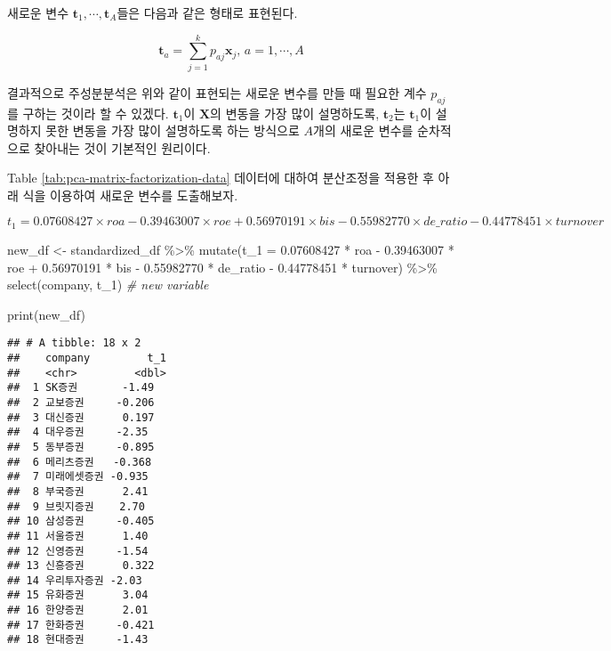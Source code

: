 \documentclass[
]{book}
\newenvironment{Shaded}{\begin{snugshade}}{\end{snugshade}}
\newcommand{\AttributeTok}[1]{\textcolor[rgb]{0.77,0.63,0.00}{#1}}
\newcommand{\CommentTok}[1]{\textcolor[rgb]{0.56,0.35,0.01}{\textit{#1}}}
\newcommand{\FloatTok}[1]{\textcolor[rgb]{0.00,0.00,0.81}{#1}}
\newcommand{\FunctionTok}[1]{\textcolor[rgb]{0.00,0.00,0.00}{#1}}
\newcommand{\NormalTok}[1]{#1}
\newcommand{\OtherTok}[1]{\textcolor[rgb]{0.56,0.35,0.01}{#1}}
\newcommand{\SpecialCharTok}[1]{\textcolor[rgb]{0.00,0.00,0.00}{#1}}
\begin{document}
새로운 변수 \(\mathbf{t}_1, \cdots, \mathbf{t}_A\)들은 다음과 같은 형태로 표현된다.

\begin{equation}
\mathbf{t}_a = \sum_{j = 1}^{k} p_{aj} \mathbf{x}_j, \, a = 1, \cdots, A
\end{equation}

결과적으로 주성분분석은 위와 같이 표현되는 새로운 변수를 만들 때 필요한 계수 \(p_{aj}\)를 구하는 것이라 할 수 있겠다. \(\mathbf{t}_1\)이 \(\mathbf{X}\)의 변동을 가장 많이 설명하도록, \(\mathbf{t}_2\)는 \(\mathbf{t}_1\)이 설명하지 못한 변동을 가장 많이 설명하도록 하는 방식으로 \(A\)개의 새로운 변수를 순차적으로 찾아내는 것이 기본적인 원리이다.

Table \ref{tab:pca-matrix-factorization-data} 데이터에 대하여 분산조정을 적용한 후 아래 식을 이용하여 새로운 변수를 도출해보자.

\[
t_1 = 0.07608427 \times roa - 0.39463007 \times roe + 0.56970191 \times bis - 0.55982770 \times de\_ratio - 0.44778451 \times turnover
\]

\begin{Shaded}
\begin{Highlighting}[]
\NormalTok{new\_df }\OtherTok{\textless{}{-}}\NormalTok{ standardized\_df }\SpecialCharTok{\%\textgreater{}\%} 
  \FunctionTok{mutate}\NormalTok{(}\AttributeTok{t\_1 =} \FloatTok{0.07608427} \SpecialCharTok{*}\NormalTok{ roa }\SpecialCharTok{{-}} \FloatTok{0.39463007} \SpecialCharTok{*}\NormalTok{ roe }
         \SpecialCharTok{+} \FloatTok{0.56970191} \SpecialCharTok{*}\NormalTok{ bis }\SpecialCharTok{{-}} \FloatTok{0.55982770} \SpecialCharTok{*}\NormalTok{ de\_ratio }
         \SpecialCharTok{{-}} \FloatTok{0.44778451} \SpecialCharTok{*}\NormalTok{ turnover) }\SpecialCharTok{\%\textgreater{}\%}
  \FunctionTok{select}\NormalTok{(company, t\_1) }\CommentTok{\# new variable}
\end{Highlighting}
\end{Shaded}

\begin{Shaded}
\begin{Highlighting}[]
\FunctionTok{print}\NormalTok{(new\_df)}
\end{Highlighting}
\end{Shaded}

\begin{verbatim}
## # A tibble: 18 x 2
##    company         t_1
##    <chr>         <dbl>
##  1 SK증권       -1.49 
##  2 교보증권     -0.206
##  3 대신증권      0.197
##  4 대우증권     -2.35 
##  5 동부증권     -0.895
##  6 메리츠증권   -0.368
##  7 미래에셋증권 -0.935
##  8 부국증권      2.41 
##  9 브릿지증권    2.70 
## 10 삼성증권     -0.405
## 11 서울증권      1.40 
## 12 신영증권     -1.54 
## 13 신흥증권      0.322
## 14 우리투자증권 -2.03 
## 15 유화증권      3.04 
## 16 한양증권      2.01 
## 17 한화증권     -0.421
## 18 현대증권     -1.43
\end{verbatim}
\end{document}
